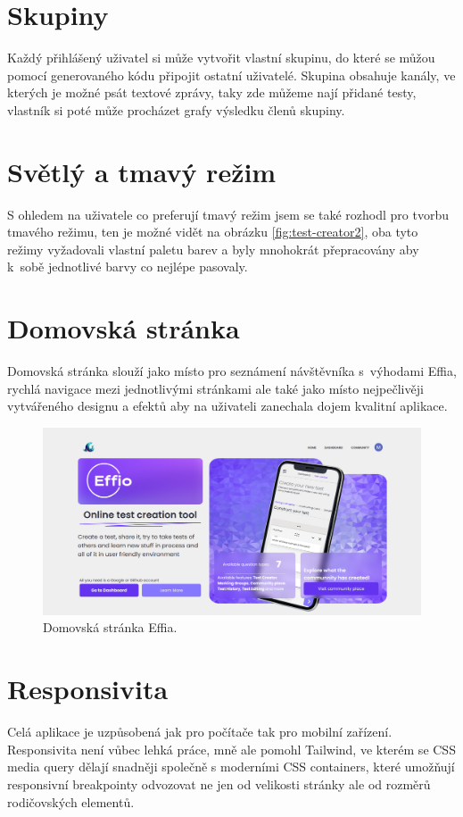 \documentclass[12pt, a4paper,
openright
]{report}
\begin{document}
\section{Skupiny}
Každý přihlášený uživatel si může vytvořit vlastní skupinu, do které se můžou pomocí generovaného kódu připojit ostatní uživatelé. Skupina obsahuje kanály, ve kterých je možné psát textové zprávy, taky zde můžeme nají přidané testy, vlastník si poté může procházet grafy výsledku členů skupiny.


\section{Světlý a tmavý režim}
S ohledem na uživatele co preferují tmavý režim jsem se také rozhodl pro tvorbu tmavého režimu, ten je možné vidět na obrázku \ref{fig:test-creator2}, oba tyto režimy vyžadovali vlastní paletu barev a byly mnohokrát přepracovány aby k~sobě jednotlivé barvy co nejlépe pasovaly.

\section{Domovská stránka}
Domovská stránka slouží jako místo pro seznámení návštěvníka s~výhodami Effia, rychlá navigace mezi jednotlivými stránkami ale také jako místo nejpečlivěji vytvářeného designu a efektů aby na uživateli zanechala dojem kvalitní aplikace.

\begin{figure}[h]
	\centering %
	\includegraphics[width=1\linewidth]{image/homepage.png} 
	\caption{Domovská stránka Effia.} %
	\label{fig:homepage} %
\end{figure}
\clearpage
\section{Responsivita}
Celá aplikace je uzpůsobená jak pro počítače tak pro mobilní zařízení. Responsivita není vůbec lehká práce, mně ale pomohl Tailwind, ve kterém se CSS media query dělají snadněji společně s moderními CSS containers, které umožňují responsivní breakpointy odvozovat ne jen od velikosti stránky ale od rozměrů rodičovských elementů.
\end{document}
